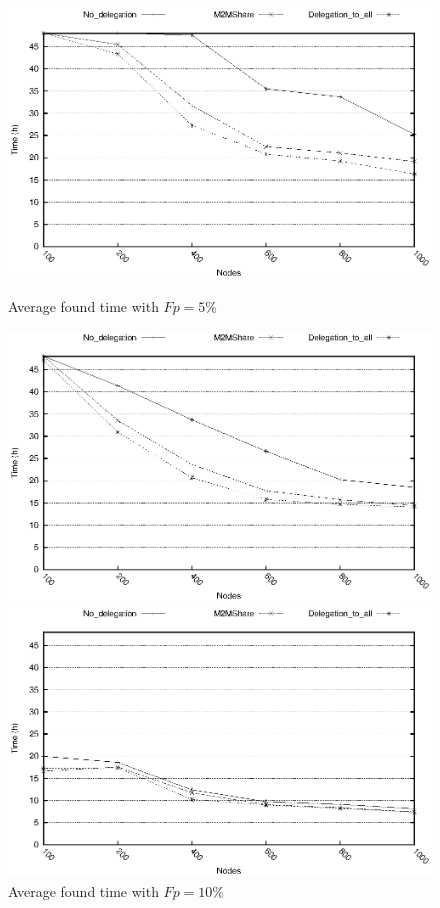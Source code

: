 \begin{figure}[ht]
\begin{minipage}[b]{0.5\linewidth}
\centering
\includegraphics[scale=0.5]{grafici/tempiVF_Fp5.eps}
\caption{Average found time with $Fp = 5\%$}
\label{graficiTempiVF_Fp5}
\end{minipage}
\hspace{0.5cm}
\begin{minipage}[b]{0.5\linewidth}
\centering
\includegraphics[scale=0.5]{grafici/tempiVF_Fp10.eps}
\caption{Average found time with $Fp = 10\%$}
\label{graficiTempiVF_Fp10}
\end{minipage}
\hspace{0.5cm}
\begin{center}
\begin{minipage}[b]{0.5\linewidth}
\centering
\includegraphics[scale=0.5]{grafici/tempiVF_Fp50.eps}

\end{minipage}
\end{center}
\end{figure}
